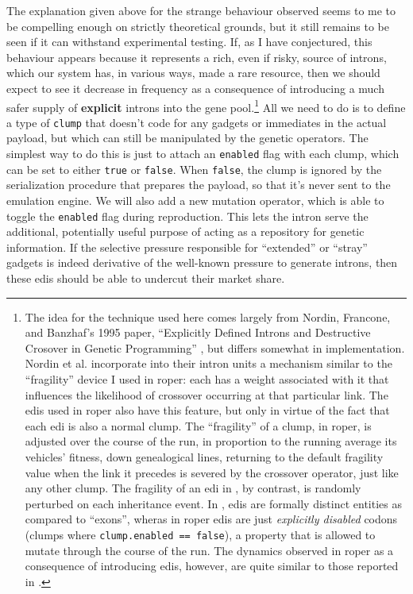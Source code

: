 \documentclass[12pt,glossary]{dalthesis}
\begin{document}
The explanation given above for the strange behaviour observed seems to me to
be compelling enough on strictly theoretical grounds, but it still remains
to be seen if it can withstand experimental testing. If, as I have conjectured,
this behaviour appears because it represents a rich, even if risky, source of
introns, which our system has, in various ways, made a rare resource, then we
should expect to see it decrease in frequency as a consequence of introducing a
much safer supply of \textbf{explicit} introns into the gene pool.\footnote{The idea for the technique used here comes largely from Nordin, Francone, and
  Banzhaf's 1995 paper, ``Explicitly Defined Introns and Destructive Crosover in Genetic
  Programming'' \cite{nordin95}, but differs somewhat in implementation. Nordin et al. 
  incorporate into their intron units a mechanism similar to the ``fragility'' device
  I used in \gls{roper}: each has a weight associated with it that influences the likelihood of crossover occurring at that particular link. The \glspl{edi} used in 
\gls{roper} also have this feature, but only in virtue of the fact that each \gls{edi}
is also a normal clump. The ``fragility'' of a clump, in \gls{roper}, is adjusted over
the course of the run, in proportion to the running average its vehicles' fitness,
down genealogical lines, returning to the default fragility value when the link it precedes
is severed by the crossover operator, just like any other clump. 
The fragility of an \gls{edi} in \cite{nordin95}, by contrast, is
randomly perturbed on each inheritance event. In \cite{nordin95}, \glspl{edi} are formally distinct entities as compared to ``exons'', wheras in \gls{roper} \glspl{edi} are just \emph{explicitly disabled} codons
(clumps where \texttt{clump.enabled == false}), a property that is allowed to mutate through the course of the run. The dynamics observed in \gls{roper} as a consequence of introducing \glspl{edi}, however, are quite similar to those reported in \cite{nordin95}.} All we need to do is
to define a type of \texttt{clump} that doesn't code for any gadgets or immediates
in the actual payload, but which can still be manipulated by the genetic
operators. The simplest way to do this is just to attach an \texttt{enabled}
flag with each clump, which can be set to either \texttt{true} or \texttt{false}. When
\texttt{false}, the clump is ignored by the serialization procedure that prepares
the payload, so that it's never sent to the emulation engine. We will also
add a new mutation operator, which is able to toggle the \texttt{enabled} flag during
reproduction. This lets the intron serve the additional, potentially useful
purpose of acting as a repository for genetic information. If the selective
pressure responsible for ``extended'' or ``stray'' gadgets is indeed derivative
of the well-known pressure to generate introns, then these \glspl{edi} should 
be able to undercut their market share.
\end{document}
